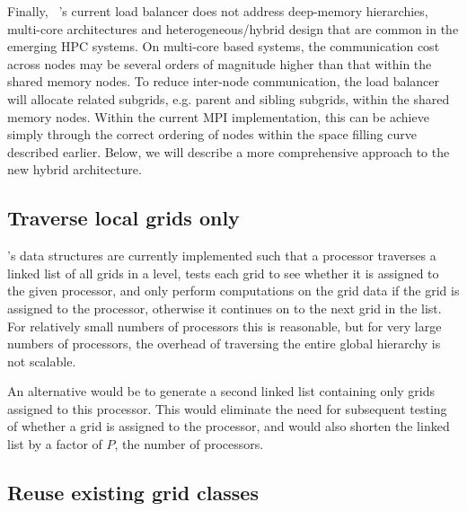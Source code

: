 \documentclass{article}
\begin{document}
Finally, \enzo\ 's current load balancer does not address deep-memory
hierarchies, multi-core architectures and heterogeneous/hybrid design
that are common in the emerging HPC systems. On multi-core based
systems, the communication cost across nodes may be several orders of
magnitude higher than that within the shared memory nodes. To reduce
inter-node communication, the load balancer will allocate related
subgrids, e.g. parent and sibling subgrids, within the shared memory
nodes.  Within the current MPI implementation, this can be achieve
simply through the correct ordering of nodes within the space filling
curve described earlier.  Below, we will describe a more comprehensive
approach to the new hybrid architecture.

\subsection{Traverse local grids only}\label{solution:amr-traversal-local}

  \enzo's data structures are currently implemented such that a
  processor traverses a linked list of all grids in a level, tests
  each grid to see whether it is assigned to the given processor, and
  only perform computations on the grid data if the grid is assigned
  to the processor, otherwise it continues on to the next grid in the
  list.  For relatively small numbers of processors this is
  reasonable, but for very large numbers of processors, the overhead
  of traversing the entire global hierarchy is not scalable.

  An alternative would be to generate a second linked list containing
  only grids assigned to this processor.  This would eliminate the
  need for subsequent testing of whether a grid is assigned to the
  processor, and would also shorten the linked list by a factor of
  $P$, the number of processors.

\subsection{Reuse existing grid classes} \label{solution:amr-grid-reuse}

\vspace{2in}
\end{document}
